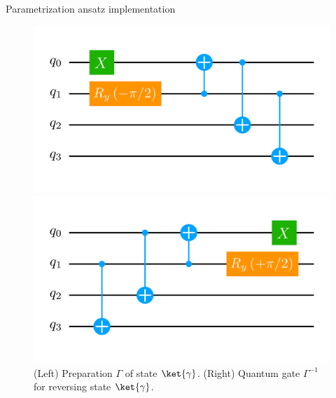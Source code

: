 \begin{frame}[allowframebreaks]{Parametrization ansatz implementation}
	\begin{figure}[!p]
		\centering
		\begin{minipage}[c]{.45\linewidth}
			\centering
			\includegraphics[width=\linewidth]{Figures/NJL1-model-solving/ansatz-implementation-base-state-preparation-gamma}
		\end{minipage}
	  \hspace{.025\linewidth}
		\begin{minipage}[c]{.45\linewidth}
			\centering
			\includegraphics[width=\linewidth]{Figures/NJL1-model-solving/ansatz-implementation-base-state-reversing-gamma}
		\end{minipage}
		\caption{(Left) Preparation $\Gamma$ of state $\ket{\gamma}$. (Right) Quantum gate $\Gamma^{-1}$ for reversing state $\ket{\gamma}$.}
	\end{figure}

\break


\end{frame}
